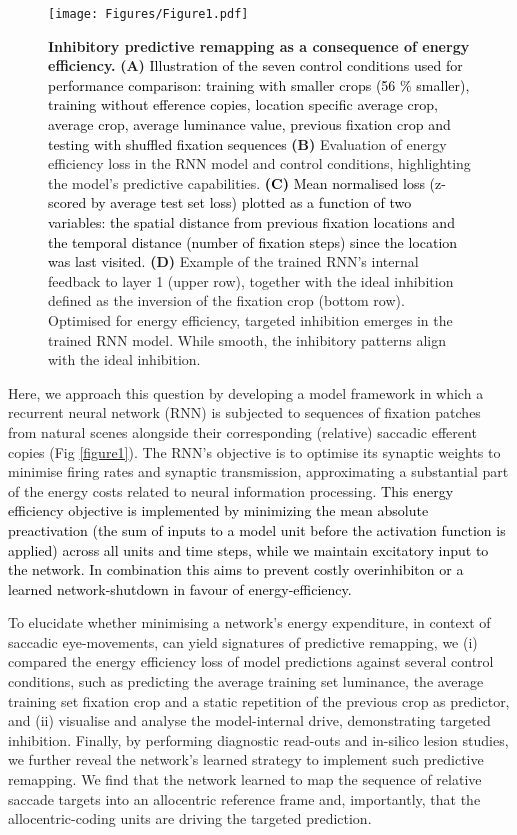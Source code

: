 \documentclass[10pt,letterpaper]{article}
\begin{document}
\begin{figure*}[ht!]
\begin{center}
\texttt{[image: Figures/Figure1.pdf]}
\end{center}
\caption{\textbf{Inhibitory predictive remapping as a consequence of energy efficiency.} \textbf{(A)} \textcolor{black}{Illustration of the seven control conditions used for performance comparison: training with smaller crops (56 \% smaller), training without efference copies, location specific average crop, average crop, average luminance value, previous fixation crop and testing with shuffled fixation sequences} \textbf{(B)} Evaluation of energy efficiency loss in the RNN model and control conditions, highlighting the model’s predictive capabilities. \textcolor{black}{\textbf{(C)} Mean normalised loss (z-scored by average test set loss) plotted as a function of two variables: the spatial distance from previous fixation locations and the temporal distance (number of fixation steps) since the location was last visited.} \textbf{(D)} Example of the trained RNN’s internal feedback to layer 1 (upper row), together with the ideal inhibition defined as the inversion of the fixation crop (bottom row). Optimised for energy efficiency, targeted inhibition emerges in the trained RNN model. While smooth, the inhibitory patterns align with the ideal inhibition.} 
\label{figure2}
\end{figure*}

Here, we approach this question by developing a model framework in which a recurrent neural network (RNN) is subjected to sequences of fixation patches from natural scenes alongside their corresponding (relative) saccadic efferent copies (Fig \ref{figure1}). The RNN's objective is to optimise its synaptic weights to minimise firing rates and synaptic transmission, approximating a substantial part of the energy costs related to neural information processing. \textcolor{black}{This energy efficiency objective is implemented by minimizing the mean absolute preactivation (the sum of inputs to a model unit before the
activation function is applied) across all units and time steps, while we maintain excitatory input to the network.
In combination this aims to prevent costly overinhibiton or a learned network-shutdown in favour of energy-efficiency.}

To elucidate whether minimising a network’s energy expenditure, in context of saccadic eye-movements, can yield signatures of predictive remapping, we (i) compared the energy efficiency loss of model predictions against several control conditions, such as predicting the average training set luminance, the average training set fixation crop and a static repetition of the previous crop as predictor, and (ii) visualise and analyse the model-internal drive, demonstrating targeted inhibition. Finally, by performing diagnostic read-outs and in-silico lesion studies, we further reveal the network’s learned strategy to implement such predictive remapping. We find that the network learned to map the sequence of relative saccade targets into an allocentric reference frame and, importantly, that the allocentric-coding units are driving the targeted prediction.
\end{document}

